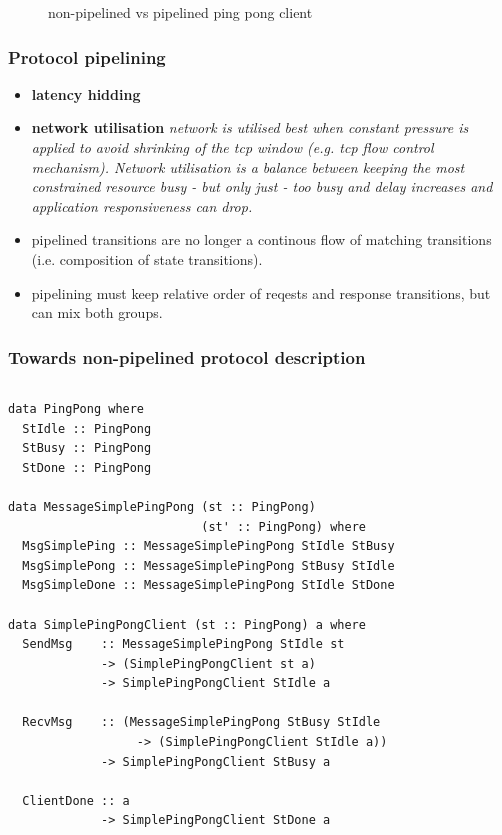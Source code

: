 \documentclass[t,dvipsnames]{beamer}
\begin{document}
\begin{frame}
\begin{figure}
\begin{minipage}{.4\textwidth}
    \end{minipage}
    \caption{non-pipelined vs pipelined ping pong client}
  \end{figure}

\end{frame}

\begin{frame}
  \frametitle{Protocol pipelining}
  \vspace{1cm}
  \begin{itemize}
    \item \textbf{latency hidding}
    \item \textbf{network utilisation}
        \textit{network is utilised best when constant pressure is
         applied to avoid shrinking of the tcp window (e.g. tcp flow control
         mechanism).  Network utilisation is a balance between keeping the most
         constrained resource busy - but only just - too busy and delay increases and
         application responsiveness can drop.}
  \end{itemize}

  \begin{itemize}
    \item pipelined transitions are no longer a continous flow of matching transitions (i.e. composition of state transitions).
    \item pipelining must keep relative order of reqests and response
      transitions, but can mix both groups.
  \end{itemize}
\end{frame}

\begin{frame}[fragile]
  \frametitle{Towards non-pipelined protocol description}
  \begin{columns}[t]
    \begin{column}{1.0\textwidth}
      \begin{verbatim}
data PingPong where
  StIdle :: PingPong
  StBusy :: PingPong
  StDone :: PingPong

data MessageSimplePingPong (st :: PingPong)
                           (st' :: PingPong) where
  MsgSimplePing :: MessageSimplePingPong StIdle StBusy
  MsgSimplePong :: MessageSimplePingPong StBusy StIdle
  MsgSimpleDone :: MessageSimplePingPong StIdle StDone

data SimplePingPongClient (st :: PingPong) a where
  SendMsg    :: MessageSimplePingPong StIdle st
             -> (SimplePingPongClient st a)
             -> SimplePingPongClient StIdle a

  RecvMsg    :: (MessageSimplePingPong StBusy StIdle
                  -> (SimplePingPongClient StIdle a))
             -> SimplePingPongClient StBusy a

  ClientDone :: a
             -> SimplePingPongClient StDone a
      \end{verbatim}
    \end{column}
  \end{columns}
\end{frame}
\end{document}
